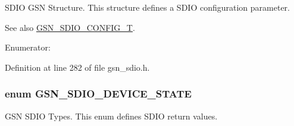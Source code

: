 SDIO GSN Structure. This structure defines a SDIO configuration parameter. 

\begin{DoxySeeAlso}{See also}
\hyperlink{a00653_ga741fda4dc2cd93143a8a73ddaace7de8}{GSN\_\-SDIO\_\-CONFIG\_\-T}. 
\end{DoxySeeAlso}
\begin{Desc}
\item[Enumerator: ]\par
\begin{description}
\item[{\em 
\hypertarget{a00653_ggaf684dd62de548c59407b206cb1a0251ca966180d41a1bee964d8209ffd63fe9cd}{
GSN\_\-SDIO\_\-CSA\_\-NO\_\-SUPPORT}
\label{a00653_ggaf684dd62de548c59407b206cb1a0251ca966180d41a1bee964d8209ffd63fe9cd}
}]\item[{\em 
\hypertarget{a00653_ggaf684dd62de548c59407b206cb1a0251ca8b135a9e2f08a74bda2fd5a6822b9a74}{
GSN\_\-SDIO\_\-CSA\_\-SUPPORT}
\label{a00653_ggaf684dd62de548c59407b206cb1a0251ca8b135a9e2f08a74bda2fd5a6822b9a74}
}]\end{description}
\end{Desc}



Definition at line 282 of file gsn\_\-sdio.h.

\hypertarget{a00653_gaa3d282bc619a73a9e7363293b8f26cdf}{
\subsubsection[{GSN\_\-SDIO\_\-DEVICE\_\-STATE}]{\setlength{\rightskip}{0pt plus 5cm}enum {\bf GSN\_\-SDIO\_\-DEVICE\_\-STATE}}}
\label{a00653_gaa3d282bc619a73a9e7363293b8f26cdf}


GSN SDIO Types. This enum defines SDIO return values. 

